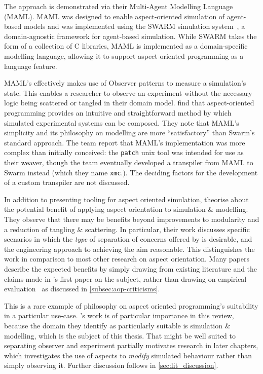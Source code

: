 The approach is demonstrated via their Multi-Agent Modelling Language (MAML). MAML
was designed to enable aspect-oriented simulation of agent-based models and was
implemented using the SWARM simulation system~\cite{hiebeler1994swarm}, a
domain-agnostic framework for agent-based simulation. While SWARM takes the form
of a collection of C libraries, MAML is implemented as a domain-specific
modelling language, allowing it to support aspect-oriented programming as a
language feature.

MAML's \aspectorientation{} effectively makes use of Observer patterns to measure
a simulation's state. This enables a researcher to observe an experiment without
the necessary logic being scattered or tangled in their domain model.
\citeauthor{gulyas1999use} find that aspect-oriented programming provides an
intuitive and straightforward method by which simulated experimental systems can
be composed. They note that MAML's simplicity and its philosophy on modelling
are more ``satisfactory'' than Swarm's standard approach. The team report that
MAML's implementation was more complex than initially conceived: the
\lstinline{patch} unix tool was intended for use as their weaver, though the
team eventually developed a transpiler from MAML to Swarm instead (which they
name \lstinline{xmc}.). The deciding factors for the development of a custom
transpiler are not discussed.

In addition to presenting tooling for aspect oriented simulation,
\citet{gulyas1999use} theorise about the potential benefit of applying aspect
orientation to simulation \& modelling. They observe that there may be benefits
beyond improvements to modularity and a reduction of tangling \& scattering. In
particular, their work discusses specific scenarios in which the \emph{type} of
separation of concerns offered by \aspectorientation{} is desirable, and the
engineering approach to achieving the aim reasonable.
This distinguishes the work in comparison to most other research on aspect
orientation. Many papers describe the expected benefits by simply drawing from
existing literature and the claims made in \citet{kiczales1997aspect}'s first
paper on the subject, rather than drawing on empirical
evaluation~\cite{steimann06paradoxical,przybylek2010wrong,przybylek2018empirical}
as discussed in \cref{subsec:aop-criticisms}.

This is a rare example of philosophy on aspect oriented programming's
suitability in a particular use-case. \citeauthor{gulyas1999use}'s work is of
particular importance in this review, because the domain they identify as
particularly suitable is simulation \& modelling, which is the subject of this
thesis. That \aspectorientation{} might be well suited to separating observer and
experiment partially motivates research in later chapters, which investigates
the use of aspects to \emph{modify} simulated behaviour rather than simply
observing it. Further discussion follows in \cref{sec:lit_discussion}.



